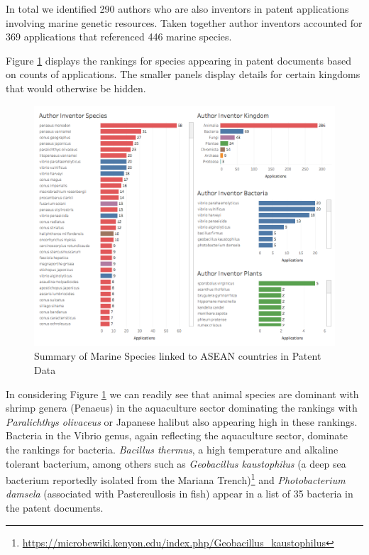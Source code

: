 \documentclass[]{book}
\theoremstyle{definition}
\theoremstyle{definition}
\theoremstyle{definition}
\theoremstyle{remark}
\begin{document}
In total we identified 290 authors who are also inventors in patent
applications involving marine genetic resources. Taken together author
inventors accounted for 369 applications that referenced 446 marine
species.

Figure \ref{fig:authorinventorspecies} displays the rankings for species
appearing in patent documents based on counts of applications. The
smaller panels display details for certain kingdoms that would otherwise
be hidden.

\begin{figure}

{\centering \includegraphics[width=1\linewidth]{images-patents/author_inventor_species_dashboard} 

}

\caption{Summary of Marine Species linked to ASEAN countries in Patent Data}\label{fig:authorinventorspecies}
\end{figure}

In considering Figure \ref{fig:authorinventorspecies} we can readily see
that animal species are dominant with shrimp genera (Penaeus) in the
aquaculture sector dominating the rankings with \emph{Paralichthys
olivaceus} or Japanese halibut also appearing high in these rankings.
Bacteria in the Vibrio genus, again reflecting the aquaculture sector,
dominate the rankings for bacteria. \emph{Bacillus thermus}, a high
temperature and alkaline tolerant bacterium, among others such as
\emph{Geobacillus kaustophilus} (a deep sea bacterium reportedly
isolated from the Mariana Trench)\footnote{\url{https://microbewiki.kenyon.edu/index.php/Geobacillus_kaustophilus}}
and \emph{Photobacterium damsela} (associated with Pastereullosis in
fish) appear in a list of 35 bacteria in the patent documents.
\end{document}
